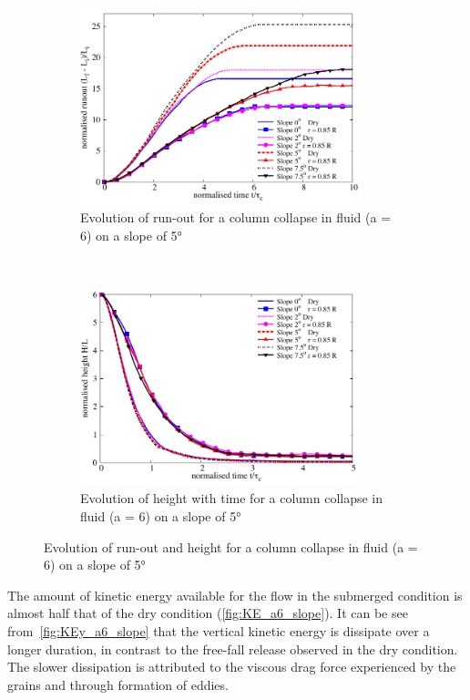 \begin{figure}
\centering
\begin{subfigure}[t]{0.9\textwidth}
\includegraphics[width=0.9\textwidth]{Runout_a6_slope}
\caption{Evolution of run-out for a column collapse in fluid (a = 6) on a 
slope of 5\si{\degree}}
\label{fig:Runout_a6_slope}
\end{subfigure} \\
\begin{subfigure}[t]{0.9\textwidth}
\centering
\includegraphics[width=0.9\textwidth]{Height_a6_slope}
\caption{Evolution of height with time for a column collapse in fluid (a = 6) 
on a slope of 5\si{\degree}}
\label{fig:Height_a6_slope}
\end{subfigure}
\caption{Evolution of  run-out and height  for a column collapse in fluid (a = 
6) on a slope of 5\si{\degree}}
\label{fig:a6_slope}
\end{figure}

The amount of kinetic energy available for the flow in the submerged condition 
is almost half that of the dry condition (\cref{fig:KE_a6_slope}). It can 
be see from~\cref{fig:KEy_a6_slope} that the vertical kinetic energy is 
dissipate over a longer duration, in contrast to the free-fall release observed 
in the dry condition. The slower dissipation is attributed to the viscous drag 
force experienced by the grains and through formation of eddies. 

